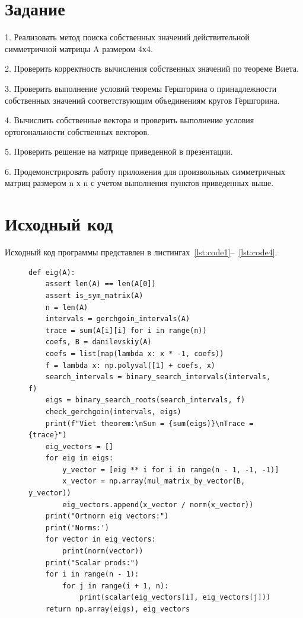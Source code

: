 \documentclass[a4paper, 14pt]{extarticle}
\begin{document}
\renewcommand{\ttdefault}{pcr}

\setlength{\tabcolsep}{3pt}
\newpage
\setcounter{page}{2}

\section{Задание}\label{Sect::task}
1. Реализовать метод поиска собственных значений действительной
симметричной матрицы A размером 4х4.

2. Проверить корректность вычисления собственных значений по теореме
Виета.

3. Проверить выполнение условий теоремы Гершгорина о принадлежности
собственных значений соответствующим объединениям кругов
Гершгорина.

4. Вычислить собственные вектора и проверить выполнение условия
ортогональности собственных векторов.

5. Проверить решение на матрице приведенной в презентации.

6. Продемонстрировать работу приложения для произвольных
симметричных матриц размером n х n с учетом выполнения пунктов
приведенных выше.
\newpage
\section{Исходный код}

Исходный код программы представлен в листингах~\ref{lst:code1}--~\ref{lst:code4}.

\begin{figure}[H]
\begin{lstlisting}[language={},caption={Вычисление собственных значений и векторов со всеми проверками},label={lst:code1}]
def eig(A):
    assert len(A) == len(A[0])
    assert is_sym_matrix(A)
    n = len(A)
    intervals = gerchgoin_intervals(A)
    trace = sum(A[i][i] for i in range(n))
    coefs, B = danilevskiy(A)
    coefs = list(map(lambda x: x * -1, coefs))
    f = lambda x: np.polyval([1] + coefs, x)
    search_intervals = binary_search_intervals(intervals, f)
    eigs = binary_search_roots(search_intervals, f)
    check_gerchgoin(intervals, eigs)
    print(f"Viet theorem:\nSum = {sum(eigs)}\nTrace = {trace}")
    eig_vectors = []
    for eig in eigs:
        y_vector = [eig ** i for i in range(n - 1, -1, -1)]
        x_vector = np.array(mul_matrix_by_vector(B, y_vector))
        eig_vectors.append(x_vector / norm(x_vector))
    print("Ortnorm eig vectors:")
    print('Norms:')
    for vector in eig_vectors:
        print(norm(vector))
    print("Scalar prods:")
    for i in range(n - 1):
        for j in range(i + 1, n):
            print(scalar(eig_vectors[i], eig_vectors[j]))
    return np.array(eigs), eig_vectors
\end{lstlisting}
\end{figure}
\end{document}
